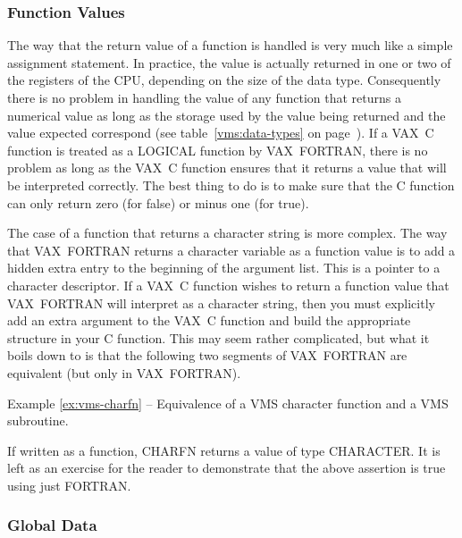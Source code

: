 \subsubsection{Function Values}

The way that the return value of a function is handled is very much like a
simple assignment statement. In practice, the value is actually returned in one
or two of the registers of the CPU, depending on the size of the data type.
Consequently there is no problem in handling the value of any function that
returns a numerical value as long as the storage used by the value being
returned and the value expected correspond (see table~\ref{vms:data-types} on
page~\pageref{vms:data-types}). If a VAX~C function is treated as a LOGICAL
function by VAX~FORTRAN, there is no problem as long as the VAX~C function
ensures that it returns a value that will be interpreted correctly. The best
thing to do is to make sure that the C function can only return zero (for
false) or minus one (for true).

The case of a function that returns a character string is more complex. The way
that VAX~FORTRAN returns a character variable as a function value is to add a
hidden extra entry to the beginning of the argument list. This is a pointer to
a character descriptor. If a VAX~C function wishes to return a function value
that VAX~FORTRAN will interpret as a character string, then you must explicitly
add an extra argument to the VAX~C function and build the appropriate structure
in your C function. This may seem rather complicated, but what it boils down to
is that the following two segments of VAX~FORTRAN are equivalent (but only in
VAX~FORTRAN).

\pagebreak[3]
\label{ex:vms-charfn}
\begin{center}
Example \ref{ex:vms-charfn} -- Equivalence of a VMS character function and a
VMS subroutine.
\end{center}
If written as a function, CHARFN returns a value of type CHARACTER. It is left
as an exercise for the reader to demonstrate that the above assertion is true
using just FORTRAN.

\subsubsection{Global Data}

